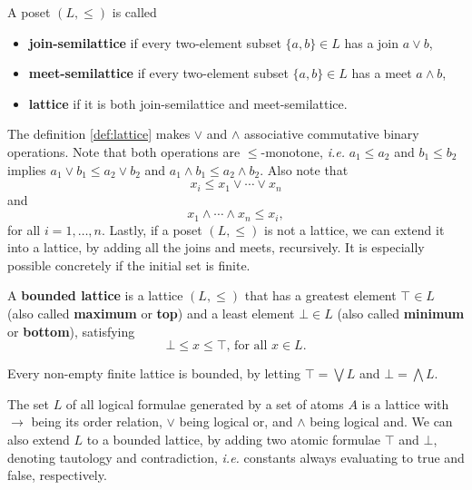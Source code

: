 \documentclass{llncs}
\begin{document}
\begin{definition}
\label{def:lattice}
A poset $(L, \leq)$ is called
\begin{itemize}
    \item \textbf{join-semilattice} if every two-element subset $\{a, b\} \in L$ has a join $a \vee b$,
    \item \textbf{meet-semilattice} if every two-element subset $\{a, b\} \in L$ has a meet $a \wedge b$,
    \item \textbf{lattice} if it is both join-semilattice and meet-semilattice.
\end{itemize}
\end{definition}

The definition \ref{def:lattice} makes $\vee$ and $\wedge$ associative commutative binary operations. Note that both operations are $\leq$-monotone, \textit{i.e.} $a_1 \leq a_2$ and $b_1 \leq b_2$ implies $a_1 \vee b_1 \leq a_2 \vee b_2$ and $a_1 \wedge b_1 \leq a_2 \wedge b_2$. Also note that
\begin{equation}
    x_i \leq x_1 \vee \cdots \vee x_n
\end{equation}
and
\begin{equation}
    x_1 \wedge \cdots \wedge x_n \leq x_i,
\end{equation}
for all $i = 1, \dots, n$. Lastly, if a poset $(L, \leq)$ is not a lattice, we can extend it into a lattice, by adding all the joins and meets, recursively. It is especially possible concretely if the initial set is finite.

\begin{definition}
A \textbf{bounded lattice} is a lattice $(L, \leq)$ that has a greatest element $\top \in L$ (also called \textbf{maximum} or \textbf{top}) and a least element $\bot \in L$ (also called \textbf{minimum} or \textbf{bottom}), satisfying
\begin{equation}
    \bot \leq x \leq \top \mbox{, for all } x \in L.
\end{equation}
\end{definition}

Every non-empty finite lattice is bounded, by letting $\top = \bigvee L$ and $\bot = \bigwedge L$.

\begin{example}
The set $L$ of all logical formulae generated by a set of atoms $A$ is a lattice with $\rightarrow$ being its order relation, $\vee$ being logical or, and $\wedge$ being logical and. We can also extend $L$ to a bounded lattice, by adding two atomic formulae $\top$ and $\bot$, denoting tautology and contradiction, \textit{i.e.} constants always evaluating to true and false, respectively.
\end{example}
\end{document}
